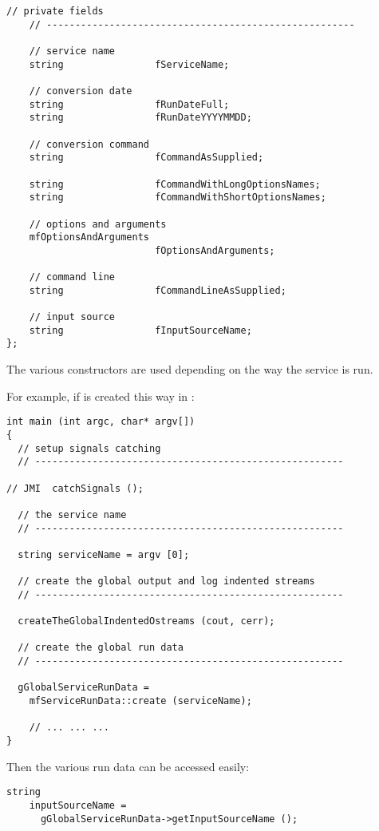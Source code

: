 \begin{lstlisting}[language=CPlusPlus]
    // private fields
    // ------------------------------------------------------

    // service name
    string                fServiceName;

    // conversion date
    string                fRunDateFull;
    string                fRunDateYYYYMMDD;

    // conversion command
    string                fCommandAsSupplied;

    string                fCommandWithLongOptionsNames;
    string                fCommandWithShortOptionsNames;

    // options and arguments
    mfOptionsAndArguments
                          fOptionsAndArguments;

    // command line
    string                fCommandLineAsSupplied;

    // input source
    string                fInputSourceName;
};
\end{lstlisting}

The various constructors are used depending on the way the service is run.

For example, if is created this way in :
\begin{lstlisting}[language=CPlusPlus]
int main (int argc, char* argv[])
{
  // setup signals catching
  // ------------------------------------------------------

// JMI	catchSignals ();

  // the service name
  // ------------------------------------------------------

  string serviceName = argv [0];

  // create the global output and log indented streams
  // ------------------------------------------------------

  createTheGlobalIndentedOstreams (cout, cerr);

  // create the global run data
  // ------------------------------------------------------

  gGlobalServiceRunData =
    mfServiceRunData::create (serviceName);

	// ... ... ...
}
\end{lstlisting}

Then the various run data can be accessed easily:
\begin{lstlisting}[language=CPlusPlus]
  string
    inputSourceName =
      gGlobalServiceRunData->getInputSourceName ();
\end{lstlisting}

